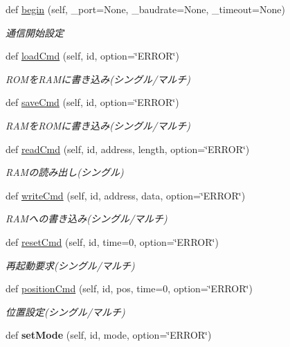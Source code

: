 \begin{DoxyCompactItemize}
\item 
def \hyperlink{classkondoServoLib_1_1b3mCtrl_1_1B3mClass_a0011e73a24e0f0ece31b4297ac0b1312}{begin} (self, \+\_\+port=None, \+\_\+baudrate=None, \+\_\+timeout=None)
\begin{DoxyCompactList}\small\item\em 通信開始設定 \end{DoxyCompactList}\item 
def \hyperlink{classkondoServoLib_1_1b3mCtrl_1_1B3mClass_a8a8d8a892485a9aa537851e08311b9b7}{load\+Cmd} (self, id, option=\char`\"{}E\+R\+R\+OR\char`\"{})
\begin{DoxyCompactList}\small\item\em R\+O\+Mを\+R\+A\+Mに書き込み(シングル/マルチ) \end{DoxyCompactList}\item 
def \hyperlink{classkondoServoLib_1_1b3mCtrl_1_1B3mClass_a4455a0ce6b75651328ddfe49360891dc}{save\+Cmd} (self, id, option=\char`\"{}E\+R\+R\+OR\char`\"{})
\begin{DoxyCompactList}\small\item\em R\+A\+Mを\+R\+O\+Mに書き込み(シングル/マルチ) \end{DoxyCompactList}\item 
def \hyperlink{classkondoServoLib_1_1b3mCtrl_1_1B3mClass_abf799c4dd10d66f48801326c7cf44372}{read\+Cmd} (self, id, address, length, option=\char`\"{}E\+R\+R\+OR\char`\"{})
\begin{DoxyCompactList}\small\item\em R\+A\+Mの読み出し(シングル) \end{DoxyCompactList}\item 
def \hyperlink{classkondoServoLib_1_1b3mCtrl_1_1B3mClass_ab5e0a4218a091ba3a499da7dcd14b31a}{write\+Cmd} (self, id, address, data, option=\char`\"{}E\+R\+R\+OR\char`\"{})
\begin{DoxyCompactList}\small\item\em R\+A\+Mへの書き込み(シングル/マルチ) \end{DoxyCompactList}\item 
def \hyperlink{classkondoServoLib_1_1b3mCtrl_1_1B3mClass_aa8a3a74d41ac831954b8a01d6f487c8a}{reset\+Cmd} (self, id, time=0, option=\char`\"{}E\+R\+R\+OR\char`\"{})
\begin{DoxyCompactList}\small\item\em 再起動要求(シングル/マルチ) \end{DoxyCompactList}\item 
def \hyperlink{classkondoServoLib_1_1b3mCtrl_1_1B3mClass_ad4eb38a1437ddae5888aeb2c34b6a813}{position\+Cmd} (self, id, pos, time=0, option=\char`\"{}E\+R\+R\+OR\char`\"{})
\begin{DoxyCompactList}\small\item\em 位置設定(シングル/マルチ) \end{DoxyCompactList}\item 
def {\bfseries set\+Mode} (self, id, mode, option=\char`\"{}E\+R\+R\+OR\char`\"{})\hypertarget{classkondoServoLib_1_1b3mCtrl_1_1B3mClass_adf996502303aa487f4053f116a53432a}{}\label{classkondoServoLib_1_1b3mCtrl_1_1B3mClass_adf996502303aa487f4053f116a53432a}


\end{DoxyCompactItemize}
